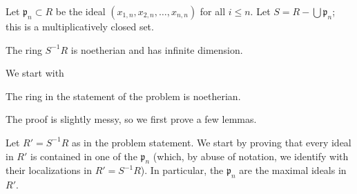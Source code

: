 Let $\mathfrak{p}_n \subset R$ be the
ideal  $(x_{1,n}, x_{2,n}, \dots, x_{n,n})$ for all $i \leq n$.
Let $S = R - \bigcup \mathfrak{p}_n$; this is a multiplicatively closed set. 

\begin{theorem}[Nagata] The ring $S^{-1}R$ is noetherian and has infinite
dimension.
\end{theorem} 

We start with
\begin{proposition} 
The ring in the statement of the problem is noetherian.
\end{proposition} 

The proof is slightly messy, so we first prove a few lemmas.

Let $R' = S^{-1}R$ as in the problem statement. We start by proving that every ideal in $R'$ is contained
in one of the $\mathfrak{p}_n$ (which, by abuse of notation, we identify with
their localizations in $R' = S^{-1}R$). 
In particular, the $\mathfrak{p}_n$ are the maximal ideals in $R'$.

